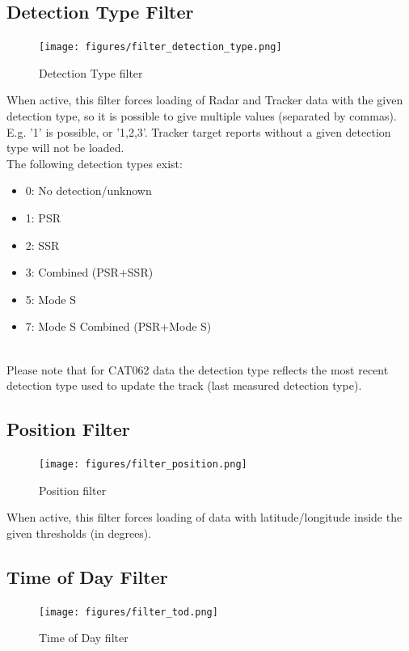 \subsection{Detection Type Filter}

\begin{figure}[H]
  \center
    \texttt{[image: figures/filter\_detection\_type.png]}
  \caption{Detection Type filter}
\end{figure}

When active, this filter forces loading of Radar and Tracker data with the given detection type, so it is possible to give multiple values (separated by commas). E.g. '1' is possible, or '1,2,3'. Tracker target reports without a given detection type will not be loaded. \\

The following detection types exist:
\begin{itemize}
 \item 0: No detection/unknown
 \item 1: PSR
 \item 2: SSR
 \item 3: Combined (PSR+SSR)
 \item 5: Mode S
 \item 7: Mode S Combined (PSR+Mode S)
\end{itemize}
\  \\

Please note that for CAT062 data the detection type reflects the most recent detection type used to update the track (last measured detection type).

\subsection{Position Filter}

\begin{figure}[H]
  \center
    \texttt{[image: figures/filter\_position.png]}
  \caption{Position filter}
\end{figure}

When active, this filter forces loading of data with latitude/longitude inside the given thresholds (in degrees).

\subsection{Time of Day Filter}

\begin{figure}[H]
  \center
    \texttt{[image: figures/filter\_tod.png]}
  \caption{Time of Day filter}
\end{figure}

